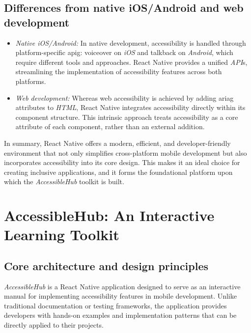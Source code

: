 \subsection{Differences from native iOS/Android and web development}
\begin{itemize}
    \item \textit{Native iOS/Android:}  
    In native development, accessibility is handled through platform-specific \gls{apig}: \gls{voiceover} on \textit{iOS} and \gls{talkback} on \textit{Android}, which require different tools and approaches. React Native provides a unified \textit{API}s, streamlining the implementation of accessibility features across both platforms.
    
    \item \textit{Web development:}  
    Whereas web accessibility is achieved by adding \gls{ariag} attributes to \textit{HTML}, React Native integrates accessibility directly within its component structure. This intrinsic approach treats accessibility as a core attribute of each component, rather than an external addition.
\end{itemize}

In summary, React Native offers a modern, efficient, and developer-friendly environment that not only simplifies cross-platform mobile development but also incorporates accessibility into its core design. This makes it an ideal choice for creating inclusive applications, and it forms the foundational platform upon which the \textit{AccessibleHub} toolkit is built.

\section{AccessibleHub: An Interactive Learning Toolkit}
\label{sec:accessiblehub}

\subsection{Core architecture and design principles}
\label{sec:accessiblehub-architecture-design}

\textit{AccessibleHub} is a React Native application designed to serve as an interactive manual for implementing accessibility features in mobile development. Unlike traditional documentation or testing frameworks, the application provides developers with hands-on examples and implementation patterns that can be directly applied to their projects.

